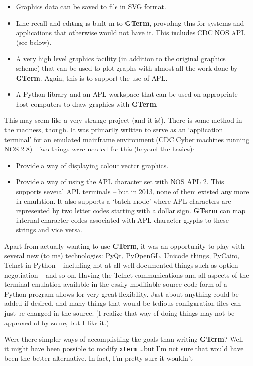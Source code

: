 \documentclass[a4paper,twoside,11pt]{article}
\newcommand{\newpara}{\par\vspace{4mm}\noindent}
\newcommand{\textbfc}[1]{\textcolor{OurRed}{#1}}
\begin{document}
\begin{itemize}
\item Graphics data can be saved to file in SVG format. 
\item Line recall and editing is built in to \textbf{GTerm}, providing this for systems and
	applications that otherwise would not have it. This includes CDC NOS APL (see below). 
\item A very high level graphics facility (in addition to the original graphics
	scheme) that can be used to plot graphs with almost all the work done by \textbf{GTerm}. Again, this is to support
	the use of APL.
\item A Python library and an APL workspace that can be used on appropriate host computers to draw graphics with  \textbf{GTerm}.
\end{itemize}
This may seem like a very strange project (and it is!). There is some method in the madness, though.
\textbfc{It was primarily written to serve
as an `application terminal' for an emulated mainframe environment (CDC Cyber machines running NOS 2.8)}.
Two things were needed for this (beyond the basics):
\begin{itemize}
\item \textbfc{Provide a way of displaying colour vector graphics}.
\item \textbfc{Provide a way of using the APL character set with NOS APL 2.} This supports several APL terminals --
      but in 2013, none of them existed any more in emulation. It also supports a `batch mode'
      where APL characters are represented by two letter codes starting with a dollar sign. \textbf{GTerm} can
      map internal character codes associated with APL character glyphs to these strings and vice versa.
\end{itemize}
Apart from actually wanting to use \textbf{GTerm}, it was an opportunity to play with several new (to me) technologies: PyQt, PyOpenGL,
Unicode things, PyCairo, Telnet in Python -- including not at all well documented things such as option negotiation -- and
so on. Having the Telnet communications and all aspects of the terminal emulation available in the easily
modifiable source code form of a Python program allows for very great flexibility. Just about anything could
be added if desired, and many things that would be tedious configuration files can just be changed in the source.
(I realize that way of doing things may not be approved of by some, but I like it.)
\newpara
Were there simpler ways of accomplishing the goals than writing \textbf{GTerm}? Well -- it might have been possible to
modify \texttt{xterm} \ldots but I'm not sure that would have been the better alternative. In fact, I'm pretty sure it wouldn't
\end{document}
